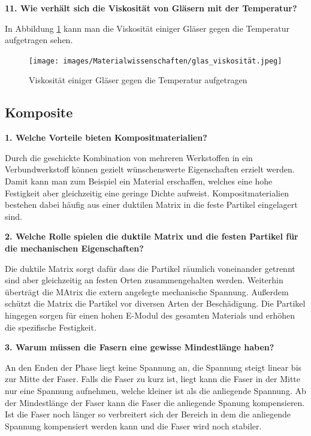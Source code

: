 \noindent\textbf{11. Wie verhält sich die Viskosität von Gläsern mit der Temperatur?}\\
\begin{addmargin}[25pt]{0pt}
In Abbildung \ref{fig:glas_viskosität} kann man die Viskosität einiger Gläser gegen die Temperatur aufgetragen sehen.
\begin{figure}[h]
    \centering
    \texttt{[image: images/Materialwissenschaften/glas\_viskosität.jpeg]}
    \caption{Viskosität einiger Gläser gegen die Temperatur aufgetragen}
    \label{fig:glas_viskosität}
\end{figure}
\end{addmargin}




\subsection{Komposite}
\noindent\textbf{1. Welche Vorteile bieten Kompositmaterialien?}\\
\begin{addmargin}[25pt]{0pt}
Durch die geschickte Kombination von mehreren Werkstoffen in ein Verbundwerkstoff können gezielt wünschenswerte Eigenschaften erzielt werden. Damit kann man zum Beispiel ein Material erschaffen, welches eine hohe Festigkeit aber gleichzeitig eine geringe Dichte aufweist. Kompositmaterialien bestehen dabei häufig aus einer duktilen Matrix in die feste Partikel eingelagert sind.\\
\end{addmargin}

\noindent\textbf{2. Welche Rolle spielen die duktile Matrix und die festen Partikel für die mechanischen Eigenschaften?}\\
\begin{addmargin}[25pt]{0pt}
Die duktile Matrix sorgt dafür dass die Partikel räumlich voneinander getrennt sind aber gleichzeitig an festen Orten zusammengehalten werden. Weiterhin überträgt die MAtrix die extern angelegte mechanische Spannung. Außerdem schützt die Matrix die Partikel vor diversen Arten der Beschädigung. Die Partikel hingegen sorgen für einen hohen E-Modul des gesamten Materials und erhöhen die spezifische Festigkeit.\\
\end{addmargin}

\noindent\textbf{3. Warum müssen die Fasern eine gewisse Mindestlänge haben?}\\
\begin{addmargin}[25pt]{0pt}
An den Enden der Phase liegt keine Spannung an, die Spannung steigt linear bis zur Mitte der Faser. Falls die Faser zu kurz ist, liegt kann die Faser in der Mitte nur eine Spannung aufnehmen, welche kleiner ist als die anliegende Spannung. Ab der Mindestlänge der Faser kann die Faser die anliegende Spanung kompensieren. Ist die Faser noch länger so verbreitert sich der Bereich in dem die anliegende Spannung kompensiert werden kann und die Faser wird noch stabiler.\\
\end{addmargin}

